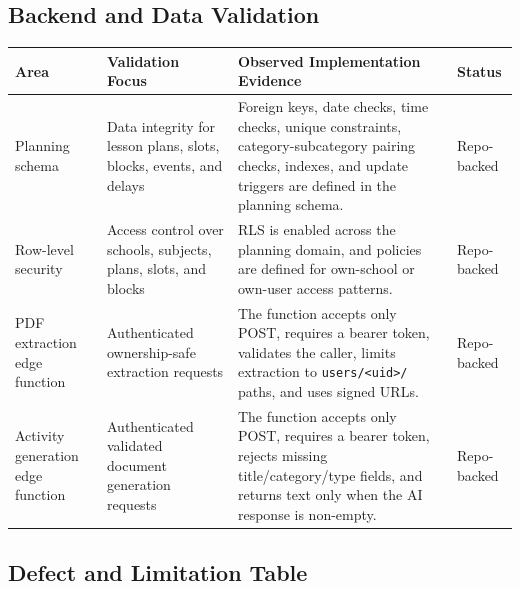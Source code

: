 \documentclass[12pt]{article}
\begin{document}
\subsection{Backend and Data Validation}

\begin{longtable}{|L{3cm}|L{4cm}|L{6cm}|L{2cm}|}
\hline
\textbf{Area} & \textbf{Validation Focus} & \textbf{Observed Implementation Evidence} & \textbf{Status} \\
\hline
Planning schema & Data integrity for lesson plans, slots, blocks, events, and delays & Foreign keys, date checks, time checks, unique constraints, category-subcategory pairing checks, indexes, and update triggers are defined in the planning schema. & Repo-backed \\
\hline
Row-level security & Access control over schools, subjects, plans, slots, and blocks & RLS is enabled across the planning domain, and policies are defined for own-school or own-user access patterns. & Repo-backed \\
\hline
PDF extraction edge function & Authenticated ownership-safe extraction requests & The function accepts only POST, requires a bearer token, validates the caller, limits extraction to \texttt{users/<uid>/} paths, and uses signed URLs. & Repo-backed \\
\hline
Activity generation edge function & Authenticated validated document generation requests & The function accepts only POST, requires a bearer token, rejects missing title/category/type fields, and returns text only when the AI response is non-empty. & Repo-backed \\
\hline
\end{longtable}

\subsection{Defect and Limitation Table}
\end{document}
